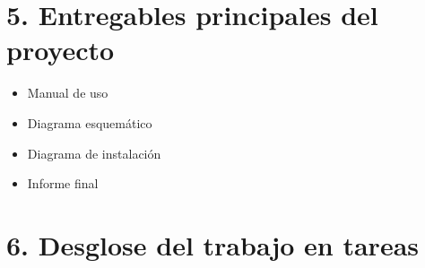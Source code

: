 \documentclass[11pt]{charter}
\begin{document}
\section{5. Entregables principales del proyecto}
\label{sec:entregables}

\begin{itemize}
\item Manual de uso
\item Diagrama esquemático
\item Diagrama de instalación
\item Informe final

\end{itemize}

\section{6. Desglose del trabajo en tareas}
\label{sec:wbs}
\end{document}
